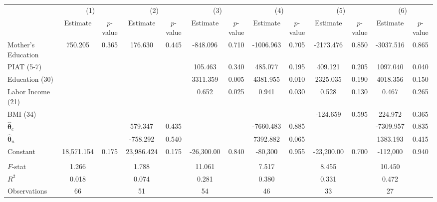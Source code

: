 \begin{tabular}{lcccccccccccc} \toprule
 & \multicolumn{2}{c}{(1)}  &  \multicolumn{2}{c}{(2)}  &  \multicolumn{2}{c}{(3)}  &  \multicolumn{2}{c}{(4)}  & \multicolumn{2}{c}{(5)} & \multicolumn{2}{c}{(6)} \\  
 & Estimate & $p$-value & Estimate & $p$-value & Estimate & $p$-value & Estimate & $p$-value & Estimate & $p$-value & Estimate & $p$-value \\ \midrule
Mother's Education &   750.205 &     0.365 &   176.630 &     0.445 &  -848.096 &     0.710 & -1006.963 &     0.705 & -2173.476 &     0.850 & -3037.516 &     0.865 \\  
PIAT (5-7) &        &        &        &        &   105.463 &     0.340 &   485.077 &     0.195 &   409.121 &     0.205 &  1097.040 &     0.040 \\  
Education (30) &        &        &        &        &  3311.359 &     0.005 &  4381.955 &     0.010 &  2325.035 &     0.190 &  4018.356 &     0.150 \\  
Labor Income (21) &        &        &        &        &     0.652 &     0.025 &     0.941 &     0.030 &     0.528 &     0.130 &     0.467 &     0.265 \\  
BMI (34)  &        &        &        &        &        &        &        &        &  -124.659 &     0.595 &   224.972 &     0.365 \\  
$\hat{\bm{\theta}}_c$ &        &        &   579.347 &     0.435 &        &        & -7660.483 &     0.885 &        &        & -7309.957 &     0.835 \\  
$\hat{\bm{\theta}}_n$&        &        &  -758.292 &     0.540 &        &        &  7392.882 &     0.065 &        &        &  1383.193 &     0.415 \\  
Constant & 18,571.154 &     0.175 & 23,986.424 &     0.175 & -26,300.00 &     0.840 & -80,300 &     0.955 & -23,200.00 &     0.700 & -112,000 &     0.940 \\  \\ \midrule
$F$-stat &     1.266 &      &     1.788 &      &    11.061 &     &     7.517 &     &     8.455 &     &    10.450 &      \\  
$R^2$ &     0.018 &      &     0.074 &      &     0.281 &      &     0.380 &      &     0.331 &     &     0.472 &     \\  
Observations &    66 &      &    51 &    &    54 &   &    46 &      &    33 &      &    27 &     \\  
\bottomrule \end{tabular}
